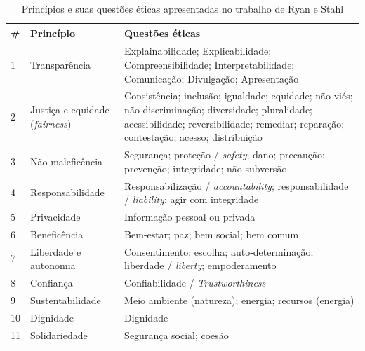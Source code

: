 \begin{footnotesize}
\begin{longtable}
{|l|p{3.6cm}|p{10.5cm}|}
\caption{Princípios e suas questões éticas apresentadas no trabalho de Ryan e Stahl \cite{Ryan2020ArtificialIE}}
 \label{tab:ryanstahlprincipios}
\\ \hline
\# & Princípio & Questões éticas
\\ \hline

1 & Transparência & Explainabilidade; Explicabilidade; Compreensibilidade; Interpretabilidade; Comunicação; Divulgação; Apresentação
\\ \hline

2 & Justiça e equidade (\textit{fairness}) & Consistência; inclusão; igualdade; equidade; não-viés; não-discriminação; diversidade; pluralidade; acessibilidade; reversibilidade; remediar; reparação; contestação; acesso; distribuição
\\ \hline

3 & Não-maleficência & Segurança; proteção / \textit{safety}; dano; precaução; prevenção; integridade; não-subversão
\\ \hline

4 & Responsabilidade & Responsabilização / \textit{accountability}; responsabilidade / \textit{liability}; agir com integridade
\\ \hline

5 & Privacidade & Informação pessoal ou privada
\\ \hline

6 & Beneficência & Bem-estar; paz; bem social; bem comum
\\ \hline

7 & Liberdade e autonomia & Consentimento; escolha; auto-determinação; liberdade / \textit{liberty}; empoderamento
\\ \hline

8 & Confiança & Confiabilidade / \textit{Trustworthiness}
\\ \hline

9 & Sustentabilidade & Meio ambiente (natureza); energia; recursos (energia)
\\ \hline

10 & Dignidade & Dignidade
\\ \hline

11 & Solidariedade & Segurança social; coesão
\\ \hline
\end{longtable}
\end{footnotesize}

